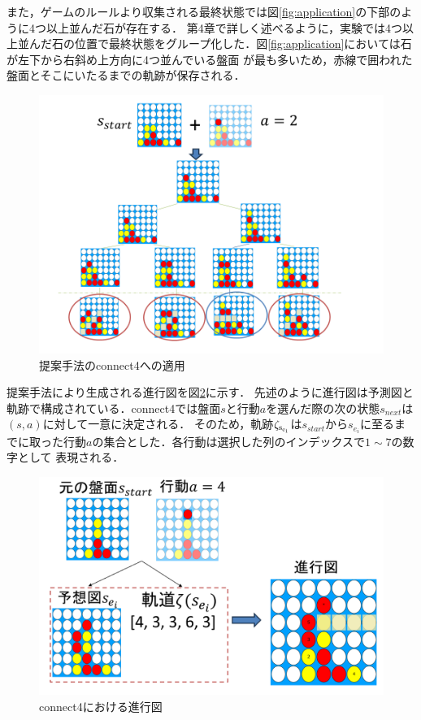 また，ゲームのルールより収集される最終状態では図\ref{fig:application}の下部のように4つ以上並んだ石が存在する．
第4章で詳しく述べるように，実験では4つ以上並んだ石の位置で最終状態をグループ化した．図\ref{fig:application}においては石が左下から右斜め上方向に4つ並んでいる盤面
が最も多いため，赤線で囲われた盤面とそこにいたるまでの軌跡が保存される．
\begin{figure}[t]
	\centering
	\includegraphics[width=\linewidth]{./figure/application.png}
	\caption{提案手法のconnect4への適用}
	\label{fig:double}
\end{figure}

提案手法により生成される進行図を図\ref{fig:double}に示す．
先述のように進行図は予測図と軌跡で構成されている．connect4では盤面$s$と行動$a$を選んだ際の次の状態$s_{next}$は$(s, a)$に対して一意に決定される．
そのため，軌跡$\rm{{\zeta}_{s_{e_i}}}$は$s_{start}$から$s_{e_i}$に至るまでに取った行動$a$の集合とした．各行動は選択した列のインデックスで$1\sim7$の数字として
表現される．
\begin{figure}[t]
	\centering
	\includegraphics[width=\linewidth]{./figure/double.png}
	\caption{connect4における進行図}
	\label{fig:double}
\end{figure}